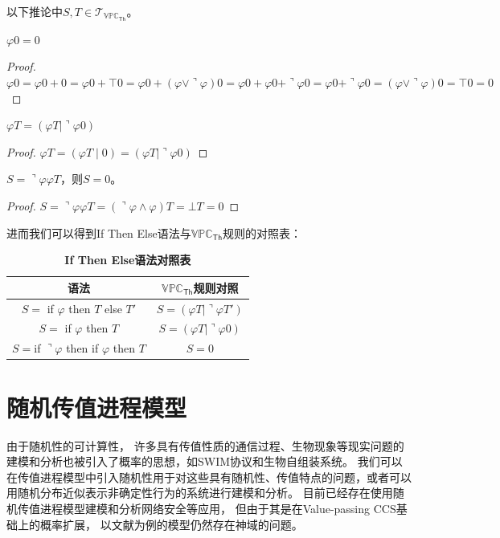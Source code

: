 以下推论中$S,T\in \mathcal{T}_{\mathbb{VPC}_\mathsf{Th}}$。
\begin{corollary} 
   $\varphi 0 = 0$
\end{corollary}
\begin{proof}
   $\varphi 0 = \varphi 0 + 0 = \varphi 0 + \top 0 = \varphi 0 + (\varphi \vee \urcorner \varphi)0 = \varphi 0 + \varphi 0 + \urcorner \varphi 0 = \varphi 0 + \urcorner \varphi 0 = (\varphi \vee \urcorner \varphi)0 = \top 0 = 0$
\end{proof}
\begin{corollary}
   $\varphi T = (\varphi T\mid \urcorner \varphi 0)$
\end{corollary}
\begin{proof}
   $\varphi T = (\varphi T\mid 0) = (\varphi T\mid \urcorner \varphi 0)$
\end{proof}
\begin{corollary}
   $S=\urcorner\varphi \varphi T$，则$S=0$。
\end{corollary}
\begin{proof}
   $S=\urcorner\varphi \varphi T = (\urcorner\varphi\wedge\varphi)T=\bot T=0$
\end{proof}
进而我们可以得到If Then Else语法与$\mathbb{VPC}_\mathsf{Th}$规则的对照表：
\begin{table}[!hpt]
   \caption{\textbf{If Then Else语法对照表}}
   \label{tab:ifthenelse}
   \centering
   \begin{tabular}{@{}cc@{}} \toprule
     语法 & $\mathbb{VPC}_{\mathsf{Th}}$规则对照 \\ \midrule
     $S=$ if $\varphi$ then $T$ else $T'$& $S=(\varphi T|\urcorner \varphi T')$\\
     $S=$ if $\varphi$ then $T$ & $S=(\varphi T|\urcorner\varphi 0)$\\
     $S = $if $\urcorner \varphi$ then if $\varphi$ then $T$ & $S=0$\\ \bottomrule
   \end{tabular}
 \end{table}
\section{随机传值进程模型}
由于随机性的可计算性，
许多具有传值性质的通信过程、生物现象等现实问题的建模和分析也被引入了概率的思想，如SWIM协议\cite{SWIM}和生物自组装系统\cite{BioProcess}。
我们可以在传值进程模型中引入随机性用于对这些具有随机性、传值特点的问题，或者可以用随机分布近似表示非确定性行为的系统进行建模和分析。
目前已经存在使用随机传值进程模型建模和分析网络安全\cite{NetworkSecurity}等应用，
但由于其是在Value-passing CCS\cite{Milner_CCS}基础上的概率扩展，
以文献\parencite{NetworkSecurity,Prob_VPCCS}为例的模型仍然存在神域的问题。

